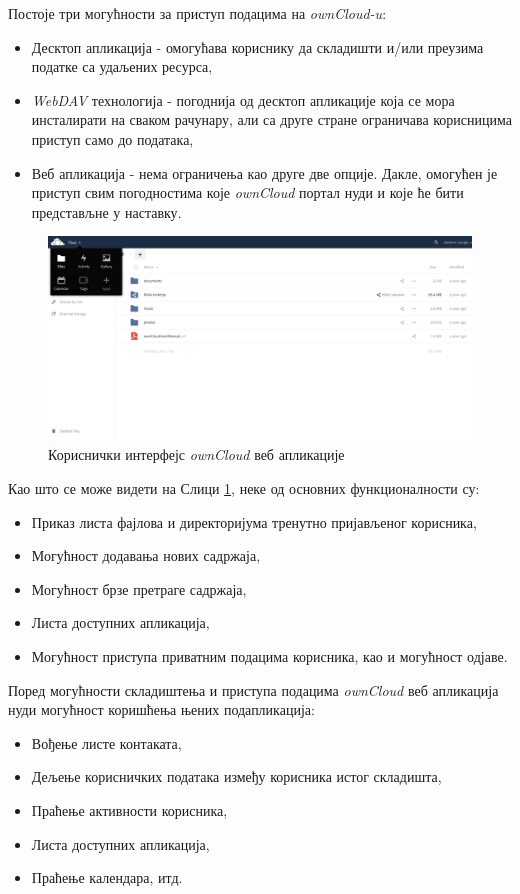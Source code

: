 Постоје три могућности за приступ подацима на \textit{ownCloud-u}:
\begin{itemize}
	\item{Десктоп апликација - омогућава кориснику да складишти и/или преузима податке са удаљених ресурса},
	\item{\textit{WebDAV} технологија - погоднија од десктоп апликације која се мора инсталирати на сваком рачунару, али са друге стране ограничава корисницима приступ само до података},
	\item{Веб апликација - нема ограничења као друге две опције. Дакле, омогућен је приступ свим погодностима које \textit{ownCloud} портал нуди и које ће бити представљне у наставку}.
\end{itemize}

\begin{figure}[H]
	\centering
	\includegraphics[scale=0.4]{slike/owncloud_ui_1.png}
	\caption{Кориснички интерфејс \textit{ownCloud} веб апликације}
	\label{fig:owncloud_ui_1}
\end{figure}

Као што се може видети на Слици \ref{fig:owncloud_ui_1}, неке од основних функционалности су:
\begin{itemize}
	\item Приказ листа фајлова и директоријума тренутно пријављеног корисника,
	\item Могућност додавања нових садржаја,
	\item Могућност брзе претраге садржаја,
	\item Листа доступних апликација,
	\item Могућност приступа приватним подацима корисника, као и могућност одјаве.
\end{itemize}

Поред могућности складиштења и приступа подацима \textit{ownCloud} веб апликација нуди могућност коришћења њених подапликација:
\begin{itemize}
	\item Вођење листе контаката,
	\item Дељење корисничких података између корисника истог складишта,
	\item Праћење активности корисника,
	\item Листа доступних апликација,
	\item Праћење календара, итд.
\end{itemize}

